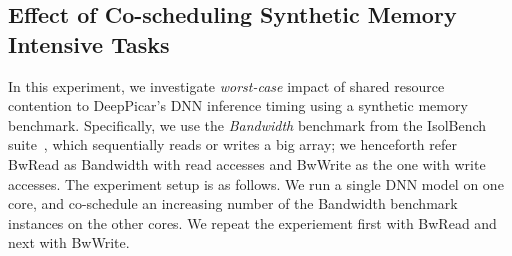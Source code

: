 
\subsection{Effect of Co-scheduling Synthetic Memory Intensive
  Tasks}\label{sec:eval-memhog} 

In this experiment, we investigate \emph{worst-case} impact of shared 
resource contention to DeepPicar's DNN inference timing using  
a synthetic memory benchmark. Specifically, we use the \emph{Bandwidth}
benchmark from the IsolBench suite~\cite{Valsan2016}, which
sequentially reads or writes a big array; we henceforth refer BwRead 
as Bandwidth with read accesses and BwWrite as the one with write
accesses. The experiment setup is as follows. We run a single DNN
model on one core, and co-schedule an increasing number of the
Bandwidth benchmark instances on the other cores. We repeat the
experiement first with BwRead and next with BwWrite.

  
